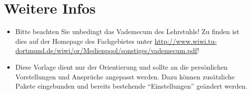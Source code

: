 \chapter{Weitere Infos}
\begin{itemize}
    \item Bitte beachten Sie unbedingt das Vademecum des Lehrstuhls! Zu finden ist dies auf der Homepage des Fachgebietes unter \url{http://www.wiwi.tu-dortmund.de/wiwi/or/Medienpool/sonstiges/vademecum.pdf}!
    \item Diese Vorlage dient nur der Orientierung und sollte an die persönlichen Vorstellungen und Ansprüche angepasst werden. Dazu können zusätzliche Pakete eingebunden und bereits bestehende "`Einstellungen"' geändert werden.
\end{itemize}

